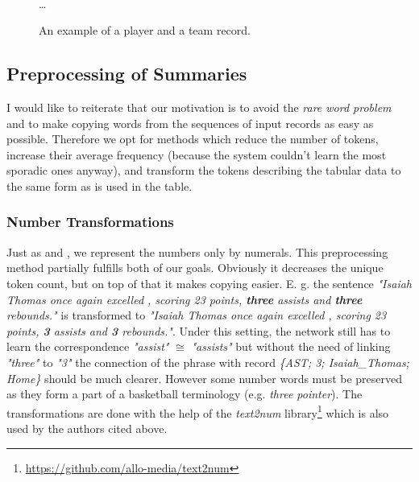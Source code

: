 \begin{figure}[!h]
    \centering
    \usetikzlibrary{shapes.multipart}
    \\ \dots
    \caption{An example of a player and a team record.} \label{rotowire_record_example}
\end{figure}

\subsection{Preprocessing of Summaries}

I would like to reiterate that our motivation is to avoid the \emph{rare word problem} and to make copying words from the sequences of input records as easy as possible. Therefore we opt for methods which reduce the number of tokens, increase their average frequency (because the system couldn't learn the most sporadic ones anyway), and transform the tokens describing the tabular data to the same form as is used in the table.

\subsubsection{Number Transformations} \label{num_trans_rw}

Just as \citep{wiseman2017} and \citep{puduppully2019datatotext}, we represent the numbers only by numerals. This preprocessing method partially fulfills both of our goals. Obviously it decreases the unique token count, but on top of that it makes copying easier. E. g. the sentence \emph{"Isaiah Thomas once again excelled , scoring 23 points, \textbf{three} assists and \textbf{three} rebounds."} is transformed to \emph{"Isaiah Thomas once again excelled , scoring 23 points, \textbf{3} assists and \textbf{3} rebounds."}. Under this setting, the network still has to learn the correspondence \emph{"assist"} $\cong$ \emph{"assists"} but without the need of linking \emph{"three"} to \emph{"3"} the connection of the phrase with record \emph{\{AST; 3; Isaiah\_Thomas; Home\}} should be much clearer. However some number words must be preserved as they form a part of a basketball terminology (e.g. \emph{three pointer}). The transformations are done with the help of the \emph{text2num} library\footnote{\url{https://github.com/allo-media/text2num}} which is also used by the authors cited above.

